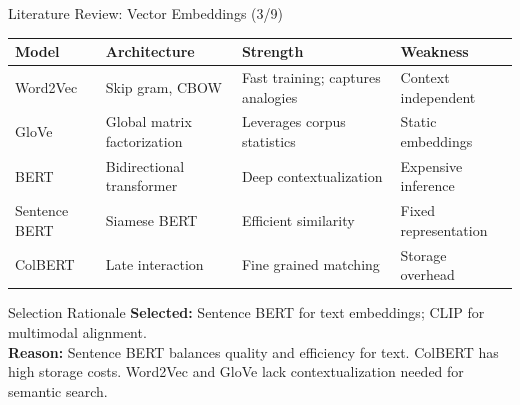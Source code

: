 \documentclass[aspectratio=169,xcolor=dvipsnames]{beamer}
\begin{document}
\begin{frame}{Literature Review: Vector Embeddings (3/9)}
    \scriptsize
    \begin{table}
        \centering
        \renewcommand{\arraystretch}{1.1}
        \begin{tabular}{p{}|p{}|p{}|p{}}
        \toprule
        \textbf{Model} & \textbf{Architecture} & \textbf{Strength} & \textbf{Weakness} \\
        \midrule
        Word2Vec \cite{mikolov2013efficient} & Skip gram, CBOW & Fast training; captures analogies & Context independent \\
        \midrule
        GloVe \cite{pennington2014glove} & Global matrix factorization & Leverages corpus statistics & Static embeddings \\
        \midrule
        BERT \cite{devlin2019bert} & Bidirectional transformer & Deep contextualization & Expensive inference \\
        \midrule
        Sentence BERT \cite{reimers2019sentence} & Siamese BERT & Efficient similarity & Fixed representation \\
        \midrule
        ColBERT \cite{khattab2020colbert} & Late interaction & Fine grained matching & Storage overhead \\
        \bottomrule
        \end{tabular}
    \end{table}
    
    \vspace{0.3em}
    \begin{block}{Selection Rationale}
        \textbf{Selected:} Sentence BERT for text embeddings; CLIP for multimodal alignment. \\
        \textbf{Reason:} Sentence BERT balances quality and efficiency for text. ColBERT has high storage costs. Word2Vec and GloVe lack contextualization needed for semantic search.
    \end{block}
\end{frame}
\end{document}
